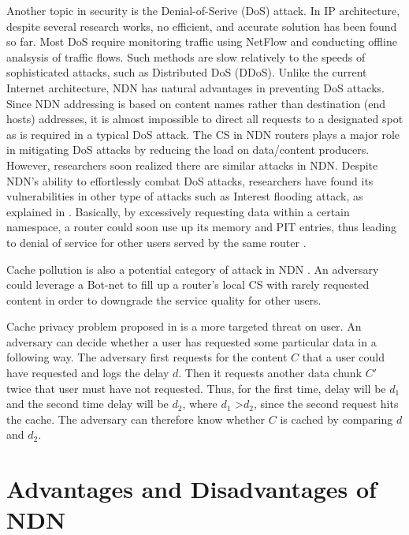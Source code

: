 \documentclass[conference,compsoc]{IEEEtran}
\begin{document}
Another topic in security is the Denial-of-Serive (DoS) attack. In IP architecture, despite several research works, no efficient, and accurate solution has been found so far. Most DoS require monitoring traffic using NetFlow and conducting offline analsysis of traffic flows. Such methods are slow relatively to the speeds of sophisticated attacks, such as Distributed DoS (DDoS). Unlike the current Internet architecture, NDN has natural advantages in preventing DoS attacks. Since NDN addressing is based on content names rather than destination (end hosts) addresses, it is almost impossible to  direct all requests to a designated spot as is required in a typical DoS attack. The CS in NDN routers plays a major role in mitigating DoS attacks by reducing the load on data/content producers. However, researchers soon realized there are similar attacks in NDN. Despite NDN's ability to effortlessly combat DoS attacks, researchers have found its vulnerabilities in other type of attacks such as Interest flooding attack, as explained in \cite{afanasyev2013interest}. Basically, by excessively requesting data within a certain namespace, a router could soon use up its memory and PIT entries, thus leading to denial of service for other users served by the same router \cite{compagno2013poseidon}.

Cache pollution is also a potential category of attack in NDN \cite{conti2013lightweight}. An adversary could leverage a Bot-net to fill up a router's local CS with rarely requested content in order to downgrade the service quality for other users.

Cache privacy problem proposed in \cite{acs2013cache} is a more targeted threat on user. An adversary can decide whether a user has requested some particular data in a following way. The adversary first requests for the content $C$ that a user could have requested and logs the delay $d$. Then it requests another data chunk $C'$ twice that user must have not requested. Thus, for the first time, delay will be $d_1$ and the second time delay will be $d_2$, where $d_1$ \textgreater $d_2$, since the second request hits the cache. The adversary can therefore know whether $C$ is cached by comparing $d$ and $d_2$.


\section{Advantages and Disadvantages of NDN}
\label{Advantages and Disadvantages of NDN}
\end{document}
